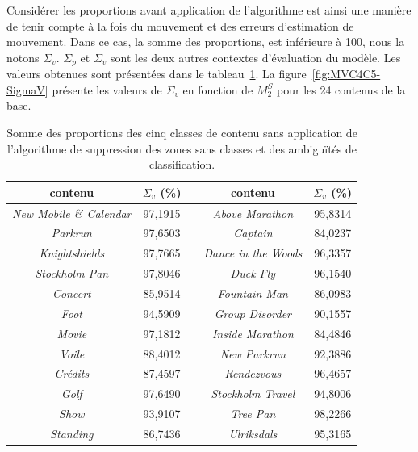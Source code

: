 Considérer les proportions avant application de l'algorithme est ainsi une manière de tenir compte à la fois du mouvement et des erreurs d'estimation de mouvement. Dans ce cas, la somme des proportions, est inférieure à 100, nous la notons $\Sigma_v$. $\Sigma_p$ et $\Sigma_v$ sont les deux autres contextes d'évaluation du modèle. Les valeurs obtenues sont présentées dans le tableau~\ref{tab:MVC4C5}. La figure~\ref{fig:MVC4C5-SigmaV} présente les valeurs de $\Sigma_v$ en fonction de $M^S_2$ pour les 24 contenus de la base.

\begin{table}[htbp]
\centering
\begin{tabular}{ccp{1cm}cc}\toprule
\textbf{contenu}							& $\Sigma_v$ (\%)	& & \textbf{contenu}						& $\Sigma_v$ (\%)	\\ \toprule
\emph{New Mobile \& Calendar}	& 97,1915 		& & \emph{Above Marathon}			& 95,8314 		\\ \midrule
\emph{Parkrun}							& 97,6503 		& & \emph{Captain}						& 84,0237 		\\ \midrule
\emph{Knightshields}					& 97,7665 		& & \emph{Dance in the Woods}	& 96,3357 		\\ \midrule
\emph{Stockholm Pan}				& 97,8046	 	& & \emph{Duck Fly}						& 96,1540 		\\ \midrule
\emph{Concert}							& 85,9514 		& & \emph{Fountain Man}				& 86,0983 		\\ \midrule
\emph{Foot}								& 94,5909	 	& & \emph{Group Disorder}			& 90,1557		\\ \midrule
\emph{Movie}								& 97,1812 		& & \emph{Inside Marathon}			& 84,4846		\\ \midrule
\emph{Voile}								& 88,4012 		& & \emph{New Parkrun}				& 92,3886		\\ \midrule
\emph{Crédits}							& 87,4597 		& & \emph{Rendezvous}					& 96,4657		\\ \midrule
\emph{Golf}									& 97,6490 		& & \emph{Stockholm Travel}			& 94,8006		\\ \midrule
\emph{Show}								& 93,9107 		& & \emph{Tree Pan}						& 98,2266		\\ \midrule
\emph{Standing}							& 86,7436 		& & \emph{Ulriksdals}						& 95,3165		\\ \bottomrule
\end{tabular}
\caption{Somme des proportions des cinq classes de contenu sans application de l'algorithme de suppression des zones sans classes et des ambiguïtés de classification.}
\label{tab:MVC4C5}
\end{table}

